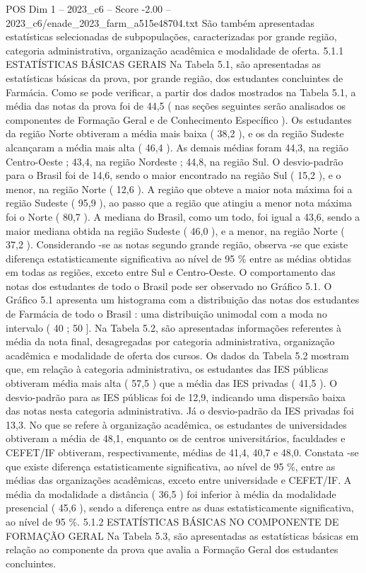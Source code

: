 \begin{textsample}{POS Dim 1 – 2023\_c6 – Score -2.00 – 2023\_c6/enade\_2023\_farm\_a515e48704.txt}
São também apresentadas estatísticas selecionadas de subpopulações, caracterizadas por grande região, categoria administrativa, organização acadêmica e modalidade de oferta. 5.1.1 ESTATÍSTICAS BÁSICAS GERAIS Na Tabela 5.1, são apresentadas as estatísticas básicas da prova, por grande região, dos estudantes concluintes de Farmácia.
Como se pode verificar, a partir dos dados mostrados na Tabela 5.1, a média das notas da prova foi de 44,5 ( nas seções seguintes serão analisados os componentes de Formação Geral e de Conhecimento Específico ).
Os estudantes da região Norte obtiveram a média mais baixa ( 38,2 ), e os da região Sudeste alcançaram a média mais alta ( 46,4 ).
As demais médias foram 44,3, na região Centro-Oeste ; 43,4, na região Nordeste ; 44,8, na região Sul.
O desvio-padrão para o Brasil foi de 14,6, sendo o maior encontrado na região Sul ( 15,2 ), e o menor, na região Norte ( 12,6 ).
A região que obteve a maior nota máxima foi a região Sudeste ( 95,9 ), ao passo que a região que atingiu a menor nota máxima foi o Norte ( 80,7 ).
A mediana do Brasil, como um todo, foi igual a 43,6, sendo a maior mediana obtida na região Sudeste ( 46,0 ), e a menor, na região Norte ( 37,2 ).
Considerando -se as notas segundo grande região, observa -se que existe diferença estatisticamente significativa ao nível de 95 \% entre as médias obtidas em todas as regiões, exceto entre Sul e Centro-Oeste.
O comportamento das notas dos estudantes de todo o Brasil pode ser observado no Gráfico 5.1.
O Gráfico 5.1 apresenta um histograma com a distribuição das notas dos estudantes de Farmácia de todo o Brasil : uma distribuição unimodal com a moda no intervalo ( 40 ; 50 ].
Na Tabela 5.2, são apresentadas informações referentes à média da nota final, desagregadas por categoria administrativa, organização acadêmica e modalidade de oferta dos cursos.
Os dados da Tabela 5.2 mostram que, em relação à categoria administrativa, os estudantes das IES públicas obtiveram média mais alta ( 57,5 ) que a média das IES privadas ( 41,5 ).
O desvio-padrão para as IES públicas foi de 12,9, indicando uma dispersão baixa das notas nesta categoria administrativa.
Já o desvio-padrão da IES privadas foi 13,3.
No que se refere à organização acadêmica, os estudantes de universidades obtiveram a média de 48,1, enquanto os de centros universitários, faculdades e CEFET/IF obtiveram, respectivamente, médias de 41,4, 40,7 e 48,0.
Constata -se que existe diferença estatisticamente significativa, ao nível de 95 \%, entre as médias das organizações acadêmicas, exceto entre universidade e CEFET/IF.
A média da modalidade a distância ( 36,5 ) foi inferior à média da modalidade presencial ( 45,6 ), sendo a diferença entre as duas estatisticamente significativa, ao nível de 95 \%. 5.1.2 ESTATÍSTICAS BÁSICAS NO COMPONENTE DE FORMAÇÃO GERAL Na Tabela 5.3, são apresentadas as estatísticas básicas em relação ao componente da prova que avalia a Formação Geral dos estudantes concluintes.

\end{textsample}

